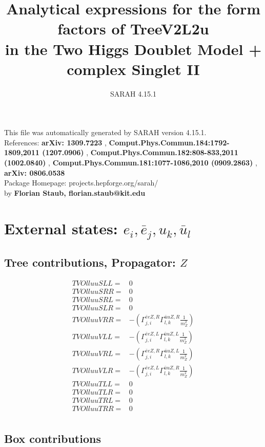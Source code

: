 \documentclass[A4,landscape]{article}
\begin{document}
\title{Analytical expressions for the form factors of TreeV2L2u\\ in the Two Higgs Doublet Model + complex Singlet II } 
 \author{SARAH 4.15.1} 
 \maketitle 
 \vspace{10cm} 
This file was automatically generated by SARAH version 4.15.1.  \\ 
References: {\bf arXiv: 1309.7223 }, {\bf Comput.Phys.Commun.184:1792-1809,2011 (1207.0906) }, {\bf Comput.Phys.Commun.182:808-833,2011 (1002.0840) }, {\bf Comput.Phys.Commun.181:1077-1086,2010 (0909.2863) }, {\bf arXiv: 0806.0538 } \\ 
Package Homepage: projects.hepforge.org/sarah/ \\ 
by {\bf Florian Staub, florian.staub@kit.edu} 
 \pagebreak 
 \tableofcontents 
 \pagebreak 
\section{External states: ${e_{{i}}, \bar{e}_{{j}}, u_{{k}}, \bar{u}_{{l}}}$} 
\subsection{Tree contributions, Propagator: $Z$} 

\begin{align} 
  TVOlluuSLL= & 0 \\ 
  TVOlluuSRR= & 0 \\ 
  TVOlluuSRL= & 0 \\ 
  TVOlluuSLR= & 0 \\ 
  TVOlluuVRR= & -(\Gamma^{\bar{e}e Z ,R}_{j, i} \Gamma^{\bar{u}u Z ,R}_{l, k} \frac{1}{m^2_{Z}}) \\ 
  TVOlluuVLL= & -(\Gamma^{\bar{e}e Z ,L}_{j, i} \Gamma^{\bar{u}u Z ,L}_{l, k} \frac{1}{m^2_{Z}}) \\ 
  TVOlluuVRL= & -(\Gamma^{\bar{e}e Z ,R}_{j, i} \Gamma^{\bar{u}u Z ,L}_{l, k} \frac{1}{m^2_{Z}}) \\ 
  TVOlluuVLR= & -(\Gamma^{\bar{e}e Z ,L}_{j, i} \Gamma^{\bar{u}u Z ,R}_{l, k} \frac{1}{m^2_{Z}}) \\ 
  TVOlluuTLL= & 0 \\ 
  TVOlluuTLR= & 0 \\ 
  TVOlluuTRL= & 0 \\ 
  TVOlluuTRR= & 0 \\ 
\end{align} 
\subsection{Box contributions} 
\end{document}
